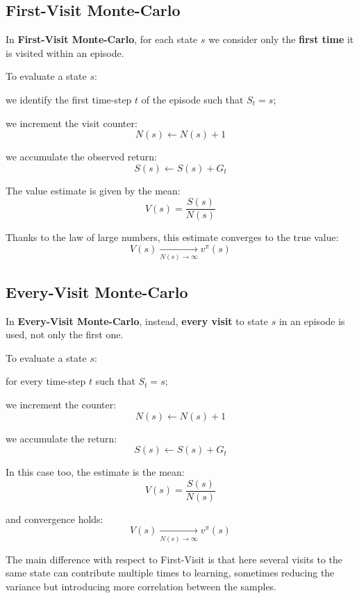 \subsection{First-Visit Monte-Carlo}

In \textbf{First-Visit Monte-Carlo}, for each state $s$ we consider only
the \textbf{first time} it is visited within an episode.

To evaluate a state $s$:

\begin{compactitemize}
    \item we identify the first time-step $t$ of the episode such that $S_t = s$;
    \item we increment the visit counter:
    \[
    N(s) \leftarrow N(s) + 1
    \]
    \item we accumulate the observed return:
    \[
    S(s) \leftarrow S(s) + G_t
    \]
\end{compactitemize}

The value estimate is given by the mean:
\[
V(s) = \frac{S(s)}{N(s)}
\]

Thanks to the law of large numbers, this estimate converges to the true value:
\[
V(s) \xrightarrow[N(s)\to\infty]{} v^\pi(s)
\]

\subsection{Every-Visit Monte-Carlo}

In \textbf{Every-Visit Monte-Carlo}, instead, \textbf{every visit} to state $s$
in an episode is used, not only the first one.

To evaluate a state $s$:

\begin{compactitemize}
    \item for every time-step $t$ such that $S_t = s$;
    \item we increment the counter:
    \[
    N(s) \leftarrow N(s) + 1
    \]
    \item we accumulate the return:
    \[
    S(s) \leftarrow S(s) + G_t
    \]
\end{compactitemize}

In this case too, the estimate is the mean:
\[
V(s) = \frac{S(s)}{N(s)}
\]

and convergence holds:
\[
V(s) \xrightarrow[N(s)\to\infty]{} v^\pi(s)
\]

\noindent
The main difference with respect to First-Visit is that here several visits to the same state
can contribute multiple times to learning, sometimes reducing the variance
but introducing more correlation between the samples.

